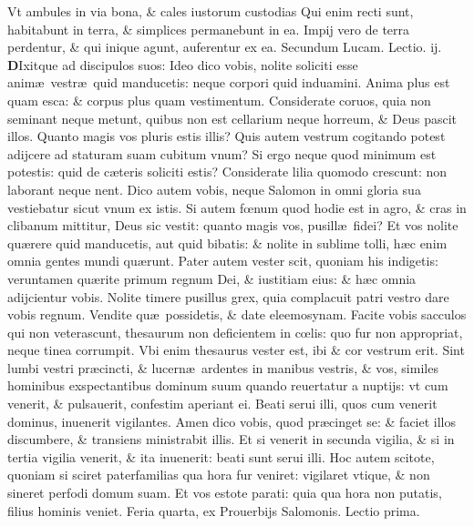 \documentclass[a5paper,10pt]{book}
\def\leftmarginnote{%
	\lrmarginnote{\hskip -\marginparsep \hskip -6.5em}}
\def\ae{æ}
\def\oe{œ}
\begin{document}
\begin{multicols*}{2}
Vt ambules in via bona, \& cales iustorum custodias Qui enim recti sunt, habitabunt in terra, \& simplices permanebunt in ea.
Impij vero de terra perdentur, \& qui inique agunt, auferentur ex ea.
\newline \color{red} Secundum Lucam. \hfill Lectio. ij. \color{black}
\vspace{-.25em}
\lettrine[lines=2]{\bfseries \color{red} D}{}Ixitque\leftmarginnote{\begin{flushright}c. 12.\end{flushright}} ad discipulos suos: Ideo dico vobis, nolite soliciti esse anim\ae \ vestr\ae \ quid manducetis: neque corpori quid induamini.
Anima plus est quam esca: \& corpus plus quam vestimentum.
Considerate coruos, quia non seminant neque metunt, quibus non est cellarium neque horreum, \& Deus pascit illos.
Quanto magis vos pluris estis illis? Quis autem vestrum cogitando potest adijcere ad staturam suam cubitum vnum?
Si ergo neque quod minimum est potestis: quid de c\ae teris soliciti estis?
Considerate lilia quomodo crescunt: non laborant neque nent. Dico autem vobis, neque Salomon in omni gloria sua vestiebatur sicut vnum ex istis.
Si autem f\oe num quod hodie est in agro, \& cras in clibanum mittitur, Deus sic vestit: quanto magis vos, pusill\ae \ fidei?
Et vos nolite qu\ae rere quid manducetis, aut quid bibatis: \& nolite in sublime tolli, h\ae c enim omnia gentes mundi qu\ae runt.
Pater autem vester scit, quoniam his indigetis: veruntamen qu\ae rite primum regnum Dei, \& iustitiam eius: \& h\ae c omnia adijcientur vobis.
Nolite timere pusillus grex, quia complacuit patri
vestro dare vobis regnum.
Vendite qu\ae \ possidetis, \& date eleemosynam. Facite vobis sacculos qui non veterascunt, thesaurum non deficientem in c\oe lis: quo fur non appropriat, neque tinea corrumpit.
Vbi enim thesaurus vester est, ibi \& cor vestrum erit. Sint lumbi vestri pr\ae cincti, \& lucern\ae \ ardentes in manibus vestris, \& vos, similes hominibus exspectantibus dominum suum quando reuertatur a nuptijs: vt cum venerit, \& pulsauerit, confestim aperiant ei.
Beati serui illi, quos cum venerit dominus, inuenerit vigilantes. Amen dico vobis, quod pr\ae cinget se: \& faciet illos discumbere, \& transiens ministrabit illis.
Et si venerit in secunda vigilia, \& si in tertia vigilia venerit, \& ita inuenerit: beati sunt serui illi.
Hoc autem scitote, quoniam si sciret paterfamilias qua hora fur veniret: vigilaret vtique, \& non sineret perfodi domum suam.
Et vos estote parati: quia qua hora non putatis, filius hominis veniet.
\newline {} \color{red} \hypertarget{WED-PRIMA-POST-ADV}{Feria quarta,} ex Prouerbijs Salomonis. \hfill Lectio prima. \color{black}

\end{multicols*}
\end{document}
